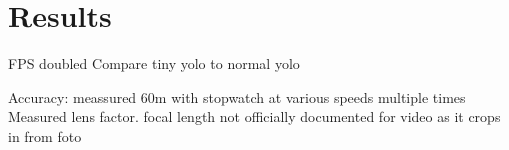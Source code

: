 
\chapter{Results} \label{cha:Results}

FPS doubled
Compare tiny yolo to normal yolo

Accuracy:
meassured 60m with stopwatch at various speeds multiple times 
Measured lens factor. focal length not officially documented for video as it crops in from foto
